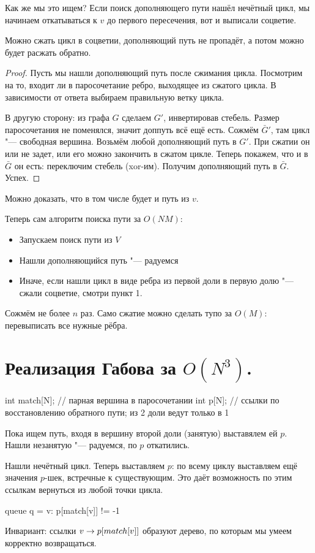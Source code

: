 Как же мы это ищем? Если поиск дополняющего пути нашёл нечётный цикл, мы начинаем откатываться к $v$ до первого пересечения, вот и выписали соцветие.

\begin{theorem}
Можно сжать цикл в соцветии, дополняющий путь не пропадёт, а потом можно будет расжать обратно.
\end{theorem}
\begin{proof}
	Пусть мы нашли дополняющий путь после сжимания цикла.
	Посмотрим на то, входит ли в паросочетание ребро, выходящее из сжатого цикла.
	В зависимости от ответа выбираем правильную ветку цикла.

	В другую сторону: из графа $G$ сделаем $G'$, инвертировав стебель.
	Размер паросочетания не поменялся, значит доппуть всё ещё есть.
	Сожмём $\bar G'$, там цикл "--- свободная вершина.
	Возьмём любой дополняющий путь в $G'$. При сжатии он или не задет, или его можно закончить в сжатом цикле.
	Теперь покажем, что и в $\bar G$ он есть: переключим стебель (xor-им).
	Получим дополняющий путь в $\bar G$. Успех.
\end{proof}
Можно доказать, что в том числе будет и путь из $v$.

Теперь сам алгоритм поиска пути за $O(NM)$:
\begin{itemize}
	\item Запускаем поиск пути из $V$
	\item Нашли дополняющийся путь "--- радуемся
	\item Иначе, если нашли цикл в виде ребра из первой доли в первую долю "--- сжали соцветие, смотри пункт 1.
\end{itemize}
Сожмём не более $n$ раз. Само сжатие можно сделать тупо за $O(M)$: перевыписать все нужные рёбра.

\section{Реализация Габова за \texorpdfstring{$O(N^3)$}{O(N\textasciicircum3)}.}
\begin{abstractcode}
int match[N]; // парная вершина в паросочетании
int p[N]; // ссылки по восстановлению обратного пути; из 2 доли ведут только в 1
\end{abstractcode}
Пока ищем путь, входя в вершину второй доли (занятую) выставялем ей $p$.
Нашли незанятую "--- радуемся, по $p$ откатились.

Нашли нечётный цикл. Теперь выставляем $p$: по всему циклу выставляем ещё значения $p$-шек, встречные к существующим.
Это даёт возможность по этим ссылкам вернуться из любой точки цикла.
\begin{abstractcode}
queue q = { v:  p[match[v]] != -1 }
\end{abstractcode}
Инвариант: ссылки $v \rightarrow p[match[v]]$ образуют дерево, по которым мы умеем корректно возвращаться.

